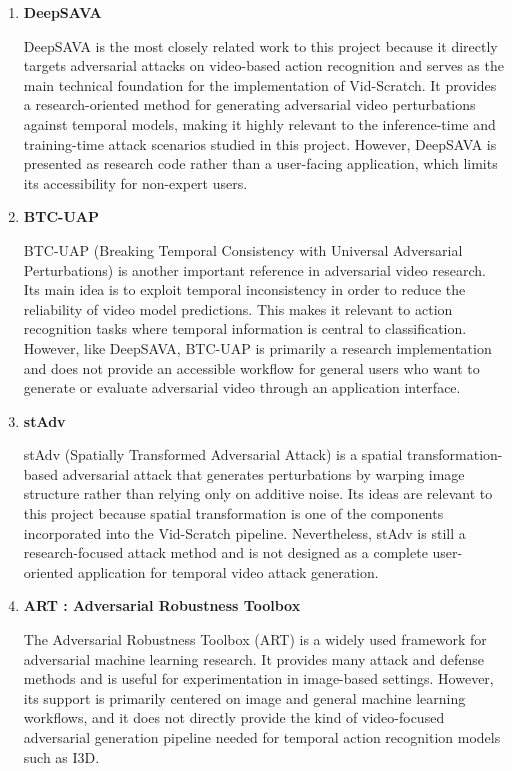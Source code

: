 \begin{enumerate}
    \item \textbf{DeepSAVA}
    
    \par DeepSAVA is the most closely related work to this project because it directly targets adversarial attacks on video-based action recognition and serves as the main technical foundation for the implementation of Vid-Scratch. It provides a research-oriented method for generating adversarial video perturbations against temporal models, making it highly relevant to the inference-time and training-time attack scenarios studied in this project. However, DeepSAVA is presented as research code rather than a user-facing application, which limits its accessibility for non-expert users.

    \item \textbf{BTC-UAP}
    
    \par BTC-UAP (Breaking Temporal Consistency with Universal Adversarial Perturbations) is another important reference in adversarial video research. Its main idea is to exploit temporal inconsistency in order to reduce the reliability of video model predictions. This makes it relevant to action recognition tasks where temporal information is central to classification. However, like DeepSAVA, BTC-UAP is primarily a research implementation and does not provide an accessible workflow for general users who want to generate or evaluate adversarial video through an application interface.

    \item \textbf{stAdv}
    
    \par stAdv (Spatially Transformed Adversarial Attack) is a spatial transformation-based adversarial attack that generates perturbations by warping image structure rather than relying only on additive noise. Its ideas are relevant to this project because spatial transformation is one of the components incorporated into the Vid-Scratch pipeline. Nevertheless, stAdv is still a research-focused attack method and is not designed as a complete user-oriented application for temporal video attack generation.

    \item \textbf{ART : Adversarial Robustness Toolbox}
    
    \par The Adversarial Robustness Toolbox (ART) is a widely used framework for adversarial machine learning research. It provides many attack and defense methods and is useful for experimentation in image-based settings. However, its support is primarily centered on image and general machine learning workflows, and it does not directly provide the kind of video-focused adversarial generation pipeline needed for temporal action recognition models such as I3D.


\end{enumerate}
